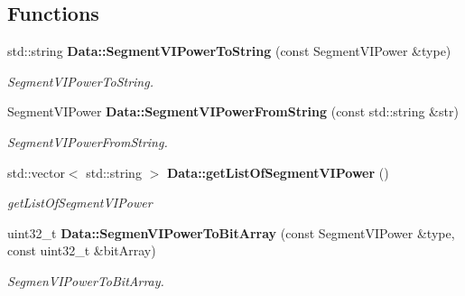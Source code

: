 \subsection*{Functions}
\begin{DoxyCompactItemize}
\item 
std\+::string \textbf{ Data\+::\+Segment\+V\+I\+Power\+To\+String} (const Segment\+V\+I\+Power \&type)
\begin{DoxyCompactList}\small\item\em Segment\+V\+I\+Power\+To\+String. \end{DoxyCompactList}\item 
Segment\+V\+I\+Power \textbf{ Data\+::\+Segment\+V\+I\+Power\+From\+String} (const std\+::string \&str)
\begin{DoxyCompactList}\small\item\em Segment\+V\+I\+Power\+From\+String. \end{DoxyCompactList}\item 
std\+::vector$<$ std\+::string $>$ \textbf{ Data\+::get\+List\+Of\+Segment\+V\+I\+Power} ()
\begin{DoxyCompactList}\small\item\em get\+List\+Of\+Segment\+V\+I\+Power \end{DoxyCompactList}\item 
uint32\+\_\+t \textbf{ Data\+::\+Segmen\+V\+I\+Power\+To\+Bit\+Array} (const Segment\+V\+I\+Power \&type, const uint32\+\_\+t \&bit\+Array)
\begin{DoxyCompactList}\small\item\em Segmen\+V\+I\+Power\+To\+Bit\+Array. \end{DoxyCompactList}\end{DoxyCompactItemize}

